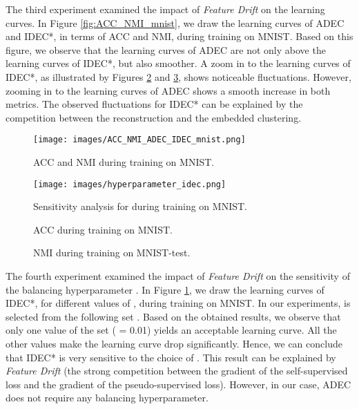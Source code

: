 \documentclass{article}
\begin{document}
The third experiment examined the impact of \textit{Feature Drift} on the learning curves. In Figure \ref{fig:ACC_NMI_mnist}, we draw the learning curves of ADEC and IDEC*, in terms of ACC and NMI, during training on MNIST. Based on this figure, we observe that the learning curves of ADEC are not only above the learning curves of IDEC*, but also smoother. A zoom in to the learning curves of IDEC*, as illustrated by Figures \ref{fig:ACC_MNIST} and \ref{fig:NMI_MNIST}, shows noticeable fluctuations. However, zooming in to the learning curves of ADEC shows a smooth increase in both metrics. The observed fluctuations for IDEC* can be explained by the competition between the reconstruction and the embedded clustering.  



\begin{figure}
\centering
\begin{minipage}{.5\textwidth}
  \centering
  \texttt{[image: images/ACC\_NMI\_ADEC\_IDEC\_mnist.png]}
  \caption{ACC and NMI during training on MNIST.}
  \label{fig:ACC_NMI_mnist}
\end{minipage}\begin{minipage}{.5\textwidth}
  \centering
  \texttt{[image: images/hyperparameter\_idec.png]}
  \caption{Sensitivity analysis for  during training on MNIST.}
  \label{fig:sensitivity_MNIST}
\end{minipage}
\end{figure}


\begin{figure}
\vskip 0.2in
\centering
    \caption{ACC during training on MNIST.}
\label{fig:ACC_MNIST}
\end{figure}

\begin{figure}
\vskip 0.2in
\centering
    \caption{NMI during training on MNIST-test.}
\label{fig:NMI_MNIST}
\end{figure}

The fourth experiment examined the impact of \textit{Feature Drift} on the sensitivity of the balancing hyperparameter . In Figure \ref{fig:sensitivity_MNIST}, we draw the learning curves of IDEC*, for different values of , during training on MNIST. In our experiments,  is selected from the following set . Based on the obtained results, we observe that only one value of the set ( = 0.01) yields an acceptable learning curve. All the other values make the learning curve drop significantly. Hence, we can conclude that IDEC* is very sensitive to the choice of . This result can be explained by \textit{Feature Drift} (the strong competition between the gradient of the self-supervised loss and the gradient of the pseudo-supervised loss). However, in our case, ADEC does not require any balancing hyperparameter.
\end{document}
